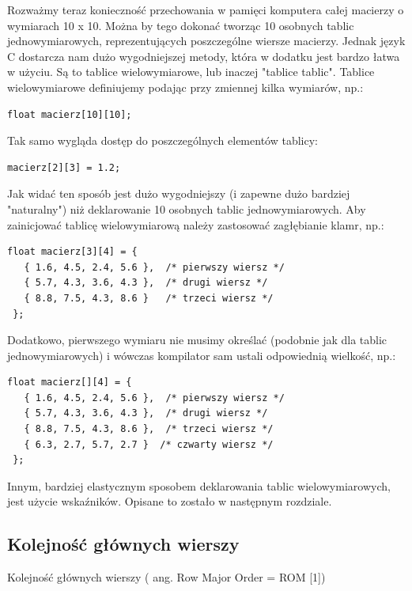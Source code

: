 \documentclass[a4paper,12pt]{article}
\begin{document}
Rozważmy teraz konieczność przechowania w pamięci komputera całej macierzy o wymiarach 10 x 10. Można by tego dokonać tworząc 10 osobnych tablic jednowymiarowych, reprezentujących poszczególne wiersze macierzy. Jednak język C dostarcza nam dużo wygodniejszej metody, która w dodatku jest bardzo łatwa w użyciu. Są to tablice wielowymiarowe, lub inaczej "tablice tablic". Tablice wielowymiarowe definiujemy podając przy zmiennej kilka wymiarów, np.:


\begin{lstlisting}[caption=Macierz, captionpos=t, label=src:sqrt, frame=lBTr, frameround=ffff, captionpos=b ]
 float macierz[10][10];
\end{lstlisting}
Tak samo wygląda dostęp do poszczególnych elementów tablicy:
\begin{lstlisting}[caption=Macierz, captionpos=t, label=src:sqrt, frame=lBTr, frameround=ffff, captionpos=b ]
macierz[2][3] = 1.2;
\end{lstlisting}
Jak widać ten sposób jest dużo wygodniejszy (i zapewne dużo bardziej "naturalny") niż deklarowanie 10 osobnych tablic jednowymiarowych. Aby zainicjować tablicę wielowymiarową należy zastosować zagłębianie klamr, np.:
\begin{lstlisting}[caption=Macierz, captionpos=t, label=src:sqrt, frame=lBTr, frameround=ffff, captionpos=b ]
 float macierz[3][4] = {
   { 1.6, 4.5, 2.4, 5.6 },  /* pierwszy wiersz */
   { 5.7, 4.3, 3.6, 4.3 },  /* drugi wiersz */
   { 8.8, 7.5, 4.3, 8.6 }   /* trzeci wiersz */
 };
\end{lstlisting}
Dodatkowo, pierwszego wymiaru nie musimy określać (podobnie jak dla tablic jednowymiarowych) i wówczas kompilator sam ustali odpowiednią wielkość, np.:

\begin{lstlisting}[caption=Macierz, captionpos=t, label=src:sqrt, frame=lBTr, frameround=ffff, captionpos=b ]
 float macierz[][4] = {
   { 1.6, 4.5, 2.4, 5.6 },  /* pierwszy wiersz */
   { 5.7, 4.3, 3.6, 4.3 },  /* drugi wiersz */
   { 8.8, 7.5, 4.3, 8.6 },  /* trzeci wiersz */
   { 6.3, 2.7, 5.7, 2.7 }  /* czwarty wiersz */
 };
\end{lstlisting}
Innym, bardziej elastycznym sposobem deklarowania tablic wielowymiarowych, jest użycie wskaźników. Opisane to zostało w następnym rozdziale.

\subsection*{Kolejność głównych wierszy}
Kolejność głównych wierszy ( ang. Row Major Order = ROM [1])
\end{document}
